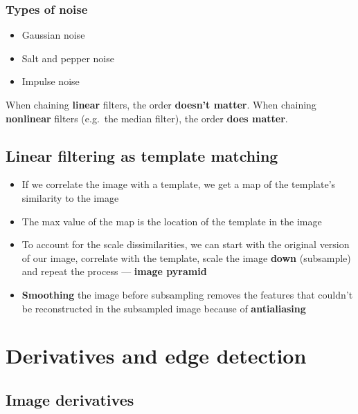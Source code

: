 \documentclass{article}
\begin{document}
            \subsubsection{Types of noise}
            \begin{itemize}
                \item Gaussian noise
                \item Salt and pepper noise
                \item Impulse noise
            \end{itemize}

            When chaining \textbf{linear} filters, the order \textbf{doesn't matter}.
            When chaining \textbf{nonlinear} filters (e.g.\ the median filter), the order \textbf{does matter}.

        \subsection{Linear filtering as template matching}
        \begin{itemize}
            \item If we correlate the image with a template, we get a map of the template's similarity to the image
            \item The max value of the map is the location of the template in the image
            \item To account for the scale dissimilarities, we can start with the original version of our image, correlate with the template, scale the image \textbf{down} (subsample) and repeat the process --- \textbf{image pyramid}
            \item \textbf{Smoothing} the image before subsampling removes the features that couldn't be reconstructed in the subsampled image because of \textbf{antialiasing}
        \end{itemize}
    
        \newpage
\section{Derivatives and edge detection}

    \subsection{Image derivatives}
\end{document}
